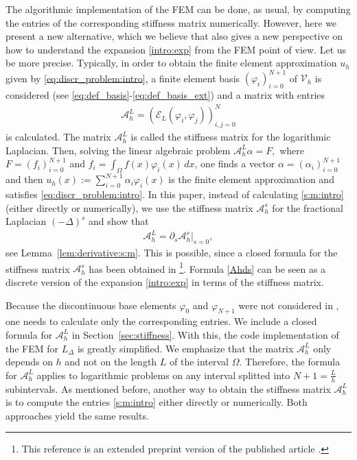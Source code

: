\documentclass[11 pt]{article}
\numberwithin{equation}{section}
\def\cE{\mathcal{E}}
\begin{document}
 The algorithmic implementation of the FEM can be done, as usual, by computing the entries of the corresponding stiffness matrix numerically. However, here we present a new alternative, which we believe that also gives a new perspective on how to understand the expansion \eqref{intro:exp} from the FEM point of view. Let us be more precise. Typically, in order to obtain the finite element approximation $u_h$ given by \eqref{eq:discr_problem:intro}, a finite element basis $(\varphi_i)_{i=0}^{N+1}$ of $\mathcal V_h$ is considered (see \eqref{eq:def_basis}-\eqref{eq:def_basis_ext}) and a matrix with entries
 \begin{align}\label{s:m:intro}
 \mathcal A_{h}^{L}=(\cE_L(\varphi_i,\varphi_j))_{i,j=0}^N
 \end{align}
 is calculated.  The matrix $\mathcal A_{h}^{L}$ is called the stiffness matrix for the logarithmic Laplacian.  Then, solving the linear algebraic problem $\mathcal A_{h}^{L}\alpha = F,$  where $F=(f_i)_{i=0}^{N+1}$ and $f_i=\int_{\Omega}f(x)\varphi_i(x)\, dx$, one finds a vector $\alpha=(\alpha_i)_{i=0}^{N+1}$ and then $u_h(x):=\sum_{i=0}^{N+1}\alpha_i \varphi_i(x)$  is the finite element approximation and satisfies \eqref{eq:discr_problem:intro}. In this paper, instead of calculating \eqref{s:m:intro} (either directly or numerically), we use the stiffness matrix $\mathcal A_{h}^{s}$ for the fractional Laplacian $(-\Delta)^s$ and show that
 \begin{align}\label{Ahds}
 \mathcal A_{h}^{L}=\partial_s \mathcal A_{h}^{s}|_{s=0},
 \end{align}
 see Lemma~\ref{lem:derivative:s:m}.  This is possible, since a closed formula for the stiffness matrix $\mathcal A_{h}^{s}$ has been obtained in \cite{BH17}\footnote{This reference is an extended preprint version of the published article \cite{BHS19}.}.  Formula \eqref{Ahds} can be seen as a discrete version of the expansion \eqref{intro:exp} in terms of the stiffness matrix.
 
 Because the discontinuous base elements $\varphi_0$ and $\varphi_{N+1}$ were not considered in \cite{BH17}, one needs to calculate only the corresponding entries.  We include a closed formula for $\mathcal A_{h}^{L}$ in Section~\ref{sec:stiffness}.  With this, the code implementation of the FEM for $L_\Delta$ is greatly simplified. We emphasize that the matrix $\mathcal A_{h}^{L}$ only depends on $h$ and not on the length $L$ of the interval $\Omega$.  Therefore, the formula for $\mathcal A_{h}^{L}$ applies to logarithmic problems on any interval splitted into $N+1=\frac{L}{h}$ subintervals. As mentioned before, another way to obtain the stiffness matrix $\mathcal A_{h}^{L}$ is to compute the entries \eqref{s:m:intro} either directly or numerically. Both approaches yield the same results.
\end{document}
